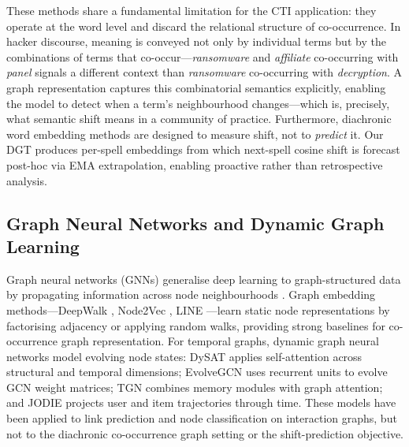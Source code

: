 \documentclass[12pt]{article}
\begin{document}
These methods share a fundamental limitation for the CTI application: they operate at the word level and discard the relational structure of co-occurrence. In hacker discourse, meaning is conveyed not only by individual terms but by the combinations of terms that co-occur---\textit{ransomware} and \textit{affiliate} co-occurring with \textit{panel} signals a different context than \textit{ransomware} co-occurring with \textit{decryption}. A graph representation captures this combinatorial semantics explicitly, enabling the model to detect when a term's neighbourhood changes---which is, precisely, what semantic shift means in a community of practice. Furthermore, diachronic word embedding methods are designed to measure shift, not to \textit{predict} it. Our DGT produces per-spell embeddings from which next-spell cosine shift is forecast post-hoc via EMA extrapolation, enabling proactive rather than retrospective analysis.

\subsection{Graph Neural Networks and Dynamic Graph Learning}

Graph neural networks (GNNs) generalise deep learning to graph-structured data by propagating information across node neighbourhoods \parencite{kipf2017, velickovic2018, hamilton2017graphsage}. Graph embedding methods---DeepWalk \parencite{perozzi2014}, Node2Vec \parencite{grover2016}, LINE \parencite{tang2015line}---learn static node representations by factorising adjacency or applying random walks, providing strong baselines for co-occurrence graph representation. For temporal graphs, dynamic graph neural networks model evolving node states: DySAT \parencite{sankar2020} applies self-attention across structural and temporal dimensions; EvolveGCN \parencite{pareja2020} uses recurrent units to evolve GCN weight matrices; TGN \parencite{rossi2020} combines memory modules with graph attention; and JODIE \parencite{kumar2019} projects user and item trajectories through time. These models have been applied to link prediction and node classification on interaction graphs, but not to the diachronic co-occurrence graph setting or the shift-prediction objective.
\end{document}
